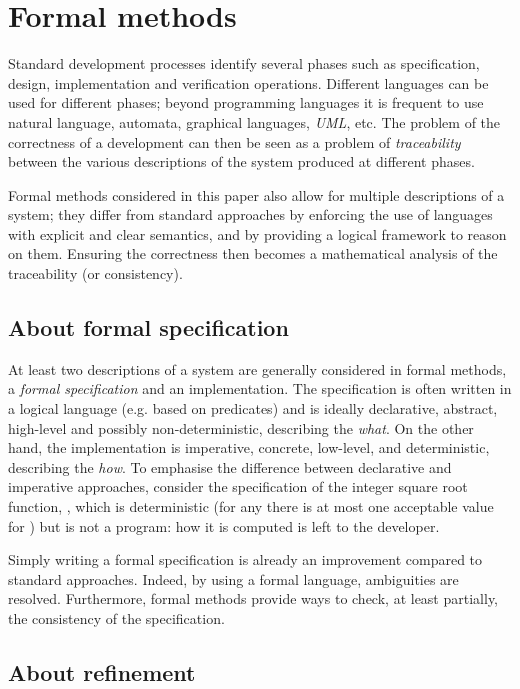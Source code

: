 \documentclass[conference]{IEEEtran}
\begin{document}
\section{Formal methods}\label{formal_methods}

Standard development processes identify several phases such as specification, design,
implementation and verification operations. Different languages can be used for different
phases; beyond programming languages it is frequent to use natural language, automata,
graphical languages, \emph{UML}, etc. The problem of the correctness of a development can then
be seen as a problem of \emph{traceability} between the various descriptions of the system
produced at different phases.

Formal methods considered in this paper also allow for multiple descriptions of a system;
they differ from standard approaches by enforcing the use of languages with explicit and clear
semantics, and by providing a logical framework to reason on them. Ensuring the correctness
then becomes a mathematical analysis of the traceability (or consistency).

\subsection{About formal specification}\label{formal_spec}

At least two descriptions of a system are generally considered in formal methods, a
\emph{formal specification} and an implementation. The specification is often written in a
logical language (e.g. based on predicates) and is ideally declarative, abstract, high-level
and possibly non-deterministic, describing the \emph{what}. On the other hand, the
implementation is imperative, concrete, low-level, and deterministic, describing the
\emph{how}. To emphasise the difference between declarative and imperative approaches,
consider the specification of the integer square root function,
{\small}, which is deterministic (for any
{\small} there is at most one acceptable value for {\small}) but is not a
program: how it is computed is left to the developer.

Simply writing a formal specification is already an improvement compared to standard
approaches. Indeed, by using a formal language, ambiguities are resolved. Furthermore, formal
methods provide ways to check, at least partially, the consistency of the specification.

\subsection{About refinement}\label{refinement}
\end{document}
